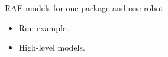 

\begin{frame}{RAE models for one package and one robot}
    \begin{itemize}
        \item Run example.
        \item High-level models.
    \end{itemize}
\end{frame}